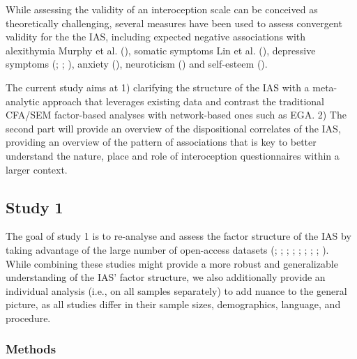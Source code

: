 \documentclass[
  man,
  floatsintext,
  longtable,
  nolmodern,
  notxfonts,
  notimes,
  colorlinks=true,linkcolor=blue,citecolor=blue,urlcolor=blue]{apa7}
\begin{document}
While assessing the validity of an interoception scale can be conceived
as theoretically challenging, several measures have been used to assess
convergent validity for the the IAS, including expected negative
associations with alexithymia Murphy et al.
(), somatic symptoms Lin et al.
(), depressive symptoms
(;
;
), anxiety
(), neuroticism
() and self-esteem
().

The current study aims at 1) clarifying the structure of the IAS with a
meta-analytic approach that leverages existing data and contrast the
traditional CFA/SEM factor-based analyses with network-based ones such
as EGA. 2) The second part will provide an overview of the dispositional
correlates of the IAS, providing an overview of the pattern of
associations that is key to better understand the nature, place and role
of interoception questionnaires within a larger context.

\subsection{Study 1}\label{study-1}

The goal of study 1 is to re-analyse and assess the factor structure of
the IAS by taking advantage of the large number of open-access datasets
(;
;
;
;
;
;
;
; ). While combining these studies might provide a more
robust and generalizable understanding of the IAS' factor structure, we
also additionally provide an individual analysis (i.e., on all samples
separately) to add nuance to the general picture, as all studies differ
in their sample sizes, demographics, language, and procedure.

\subsubsection{Methods}\label{methods}
\end{document}
